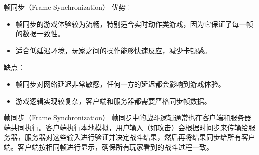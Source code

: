 \documentclass{beamer}
\begin{document}

\begin{frame}[fragile]{帧同步（Frame Synchronization）}
优势：
\begin{itemize}
\item 帧同步的游戏体验较为流畅，特别适合实时动作类游戏，因为它保证了每一帧的数据一致性。
\item 适合低延迟环境，玩家之间的操作能够快速反应，减少卡顿感。
\end{itemize}

\vspace{1em}

缺点：
\begin{itemize}
\item 帧同步对网络延迟非常敏感，任何一方的延迟都会影响到游戏体验。
\item 游戏逻辑实现较复杂，客户端和服务器都需要严格同步帧数据。
\end{itemize}
\end{frame}


\begin{frame}[fragile]{帧同步（Frame Synchronization）}
帧同步中的战斗逻辑通常也在客户端和服务器端共同执行。客户端执行本地模拟，用户输入（如攻击）会根据时间步来传输给服务器，服务器对这些输入进行验证并决定战斗结果，然后再将结果同步给所有客户端。客户端按相同帧进行显示，确保所有玩家看到的战斗过程一致。
\end{frame}


\backmatter
\end{document}
